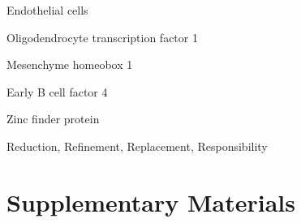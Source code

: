 \documentclass[
	a4paper, %
	10pt, %
	unnumberedsections, %
	twoside, %
]{LTJournalArticle}
\begin{document}
\begin{description}[leftmargin=*, widest=FR Algorithm]
		\item[EC]
		Endothelial cells

		\item[OLIG1]
		Oligodendrocyte transcription factor 1

		\item[MEOX1]
		Mesenchyme homeobox 1

		\item[EBF4]
		Early B cell factor 4

		\item[ZNF]
		Zinc finder protein

		\item[4Rs]
		Reduction, Refinement, Replacement, Responsibility


	\end{description}

\section{\large Supplementary Materials}\label{supplement}
\end{document}
